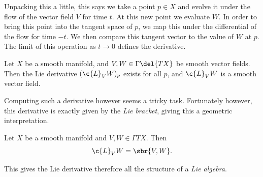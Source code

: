 Unpacking this a little, this says we take a point \(p\in X\) and evolve it under the flow of the vector field \(V\) for time \(t\).
At this new point we evaluate \(W\).
In order to bring this point into the tangent space of \(p\), we map this under the differential of the flow for time \(-t\). 
We then compare this tangent vector to the value of \(W\) at \(p\).
The limit of this operation as \(t\to 0\) defines the derivative.
\begin{lemma}
	Let \(X\) be a smooth manifold, and \(V, W \in \Gamma\del{TX}\) be smooth vector fields.
	Then the Lie derivative \((\c{L}_V W)_p\) exists for all \(p\), and \(\c{L}_V W\) is a smooth vector field.
\end{lemma}
Computing such a derivative however seems a tricky task. 
Fortunately however, this derivative is exactly given by the \emph{Lie bracket}, giving this a geometric interpretation.
\begin{theorem}
	Let \(X\) be a smooth manifold and \(V, W\in \Gamma{TX}\).
	Then \[\c{L}_V W = \sbr{V, W}.\]
\end{theorem}
This gives the Lie derivative therefore all the structure of a \emph{Lie algebra}.

